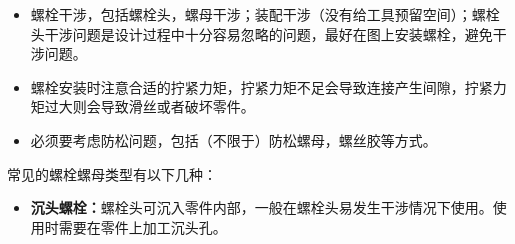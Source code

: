 \documentclass[UTF8]{article} %
\begin{document}
\begin{itemize}
  \item 螺栓干涉，包括螺栓头，螺母干涉；装配干涉（没有给工具预留空间）；螺栓头干涉问题是设计过程中十分容易忽略的问题，最好在图上安装螺栓，避免干涉问题。
	\item 螺栓安装时注意合适的拧紧力矩，拧紧力矩不足会导致连接产生间隙，拧紧力矩过大则会导致滑丝或者破坏零件。
  \item 必须要考虑防松问题，包括（不限于）防松螺母，螺丝胶等方式。
\end{itemize}

常见的螺栓螺母类型有以下几种：
\begin{itemize}
  \item \textbf{沉头螺栓：}螺栓头可沉入零件内部，一般在螺栓头易发生干涉情况下使用。使用时需要在零件上加工沉头孔。
  

\end{itemize}
\end{document}
